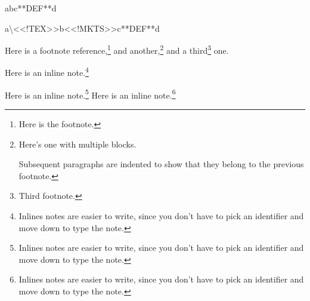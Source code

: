 
\mktsShowpar\par
abc**DEF**d\mktsShowpar\par
{\mktsStyleCode{}a\textbackslash{}<<!TEX>>b<<!MKTS>>c**DEF**d}\mktsShowpar\par
Here is a footnote reference,\footnote{Here is the footnote.\mktsShowpar\par
} and another,\footnote{Here’s one with multiple blocks.\mktsShowpar\par
Subsequent paragraphs are indented to show that they
belong to the previous footnote.\mktsShowpar\par
}
and a third\footnote{Third footnote.\mktsShowpar\par
} one.\mktsShowpar\par
Here is an inline note.\footnote{Inlines notes are easier to write, since
you don't have to pick an identifier and move down to type the
note.\mktsShowpar\par
}\mktsShowpar\par
Here is an inline note.\footnote{Inlines notes are easier to write, since
you don't have to pick an identifier and move down to type the
note.\mktsShowpar\par
} Here is an inline note.\footnote{Inlines notes are easier to write, since
you don't have to pick an identifier and move down to type the
note.\mktsShowpar\par
}


